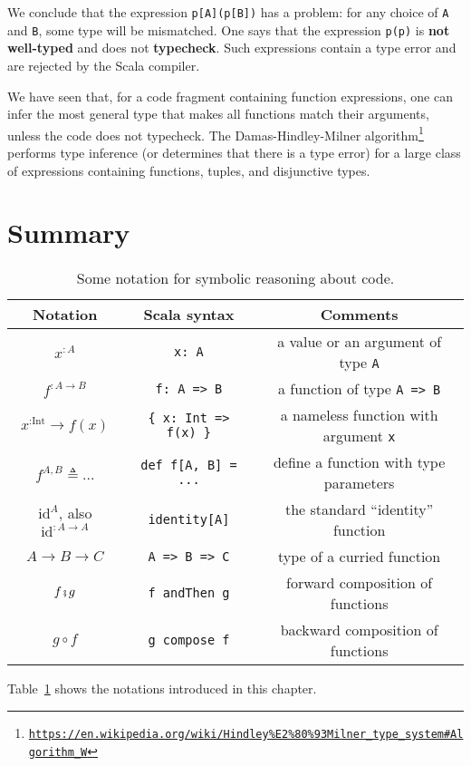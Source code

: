 We conclude that the expression \lstinline!p[A](p[B])! has a problem:
for any choice of \lstinline!A! and \lstinline!B!, some type will
be mismatched. One says that the expression \lstinline!p(p)! is \textbf{not
well-typed} and does not \textbf{typecheck}.
Such expressions contain a type error and are rejected by the Scala
compiler. 

We have seen that, for a code fragment containing  function expressions,
one can infer the most general type that makes all functions match
their arguments, unless the code does not typecheck. The Damas-Hindley-Milner
algorithm\footnote{\texttt{\href{https://en.wikipedia.org/wiki/Hindley\%E2\%80\%93Milner_type_system\#Algorithm_W}{https://en.wikipedia.org/wiki/Hindley\%E2\%80\%93Milner\_type\_system\#Algorithm\_W}}}
performs type inference (or determines that
there is a type error) for a large class of expressions containing
functions, tuples, and disjunctive types.

\section{Summary}

\begin{table}
\begin{centering}
\begin{tabular}{|c|c|c|}
\hline 
\textbf{\small{}Notation} & \textbf{\small{}Scala syntax} & \textbf{\small{}Comments}\tabularnewline
\hline 
\hline 
{\small{}$x^{:A}$} & {\small{}}\lstinline!x: A! & {\small{}a value or an argument of type }\lstinline!A!\tabularnewline
\hline 
{\small{}$f^{:A\rightarrow B}$} & {\small{}}\lstinline!f: A => B! & {\small{}a function of type }\lstinline!A => B!\tabularnewline
\hline 
{\small{}$x^{:\text{Int}}\rightarrow f(x)$} & {\small{}}\lstinline!{ x: Int => f(x) }! & {\small{}a nameless function with argument }\lstinline!x!\tabularnewline
\hline 
{\small{}$f^{A,B}\triangleq...$} & {\small{}}\lstinline!def f[A, B] = ...! & {\small{}define a function with type parameters}\tabularnewline
\hline 
{\small{}$\text{id}^{A}$, also $\text{id}^{:A\rightarrow A}$} & {\small{}}\lstinline!identity[A]! & {\small{}the standard \textsf{``}identity\textsf{''} function}\tabularnewline
\hline 
{\small{}$A\rightarrow B\rightarrow C$} & {\small{}}\lstinline!A => B => C! & {\small{}type of a curried function}\tabularnewline
\hline 
{\small{}$f\bef g$} & {\small{}}\lstinline!f andThen g! & {\small{}forward composition of functions}\tabularnewline
\hline 
{\small{}$g\circ f$} & {\small{}}\lstinline!g compose f! & {\small{}backward composition of functions}\tabularnewline
\hline 
\end{tabular}
\par\end{centering}
\caption{Some notation for symbolic reasoning about code.\label{tab:Mathematical-notation-for-code}}
\end{table}
Table~\ref{tab:Mathematical-notation-for-code} shows the notations
introduced in this chapter. 

